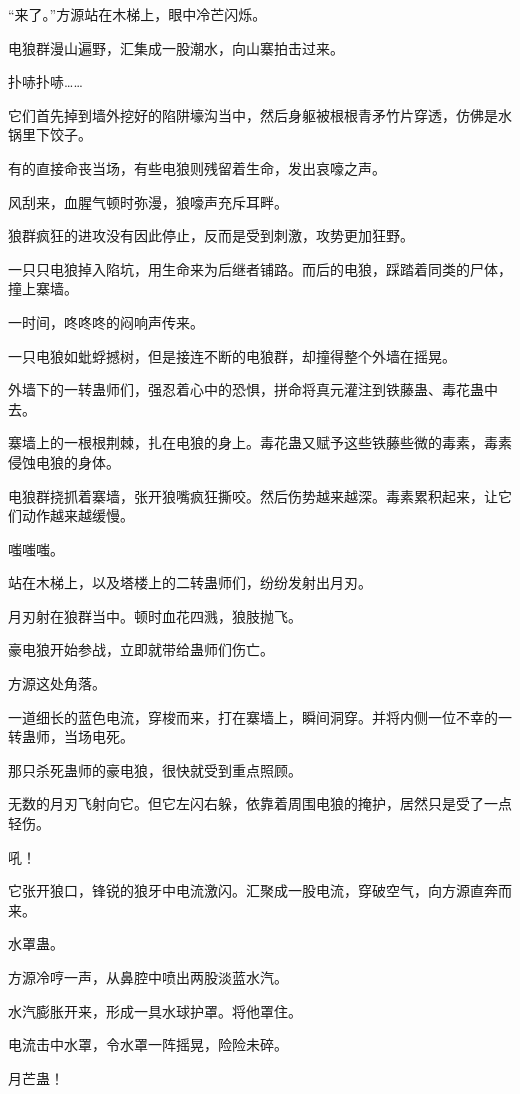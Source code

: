 \begin{this_body}
“来了。”方源站在木梯上，眼中冷芒闪烁。

电狼群漫山遍野，汇集成一股潮水，向山寨拍击过来。

扑哧扑哧……

它们首先掉到墙外挖好的陷阱壕沟当中，然后身躯被根根青矛竹片穿透，仿佛是水锅里下饺子。

有的直接命丧当场，有些电狼则残留着生命，发出哀嚎之声。

风刮来，血腥气顿时弥漫，狼嚎声充斥耳畔。

狼群疯狂的进攻没有因此停止，反而是受到刺激，攻势更加狂野。

一只只电狼掉入陷坑，用生命来为后继者铺路。而后的电狼，踩踏着同类的尸体，撞上寨墙。

一时间，咚咚咚的闷响声传来。

一只电狼如蚍蜉撼树，但是接连不断的电狼群，却撞得整个外墙在摇晃。

外墙下的一转蛊师们，强忍着心中的恐惧，拼命将真元灌注到铁藤蛊、毒花蛊中去。

寨墙上的一根根荆棘，扎在电狼的身上。毒花蛊又赋予这些铁藤些微的毒素，毒素侵蚀电狼的身体。

电狼群挠抓着寨墙，张开狼嘴疯狂撕咬。然后伤势越来越深。毒素累积起来，让它们动作越来越缓慢。

嗤嗤嗤。

站在木梯上，以及塔楼上的二转蛊师们，纷纷发射出月刃。

月刃射在狼群当中。顿时血花四溅，狼肢抛飞。

豪电狼开始参战，立即就带给蛊师们伤亡。

方源这处角落。

一道细长的蓝色电流，穿梭而来，打在寨墙上，瞬间洞穿。并将内侧一位不幸的一转蛊师，当场电死。

那只杀死蛊师的豪电狼，很快就受到重点照顾。

无数的月刃飞射向它。但它左闪右躲，依靠着周围电狼的掩护，居然只是受了一点轻伤。

吼！

它张开狼口，锋锐的狼牙中电流激闪。汇聚成一股电流，穿破空气，向方源直奔而来。

水罩蛊。

方源冷哼一声，从鼻腔中喷出两股淡蓝水汽。

水汽膨胀开来，形成一具水球护罩。将他罩住。

电流击中水罩，令水罩一阵摇晃，险险未碎。

月芒蛊！


\end{this_body}
